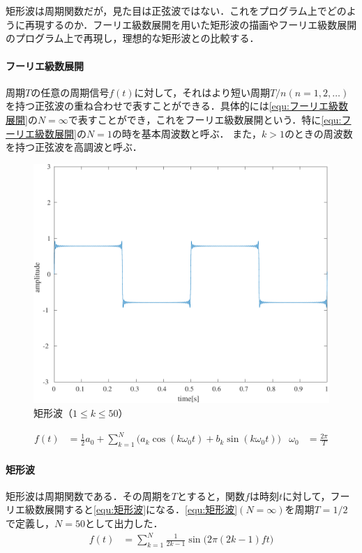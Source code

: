 \section{\kadaiad}\label{sec:\kadaiad}
\purpose
矩形波は周期関数だが，見た目は正弦波ではない．これをプログラム上でどのように再現するのか．フーリエ級数展開を用いた矩形波の描画やフーリエ級数展開のプログラム上で再現し，理想的な矩形波との比較する．
\method
\paragraph{フーリエ級数展開}周期\(T\)の任意の周期信号\(f(t)\)に対して，それはより短い周期\(T/n(n=1,2,\dots)\)を持つ正弦波の重ね合わせで表すことができる．具体的には\eqref{equ:フーリエ級数展開}の\(N=\infty\)で表すことができ，これをフーリエ級数展開という．\cite[p.18-p.19]{信号処理}特に\eqref{equ:フーリエ級数展開}の\(N=1\)の時を基本周波数と呼ぶ．
また，\(k>1\)のときの周波数を持つ正弦波を高調波と呼ぶ．

\begin{figure}
    \includegraphics[keepaspectratio,width=.3\textwidth]{../../Figures/01_04_1.pdf}
    \caption{矩形波（\(1\leq k\leq 50\)）}
    \label{fig:矩形波}
\end{figure}
\begin{align}
    f(t) & =\frac{1}{2}a_0 + \sum_{k=1}^{N}\big(a_k\cos(k\omega_0t)+b_k\sin(k\omega_0t)\big) & \omega_0 & =\frac{2\pi}{T}\label{equ:フーリエ級数展開}
\end{align}
\paragraph{矩形波}
矩形波は周期関数である．その周期を\(T\)とすると，関数\(f\)は時刻\(t\)に対して，フーリエ級数展開すると\eqref{equ:矩形波}になる．\eqref{equ:矩形波}\((N=\infty)\)を周期\(T=1/2\)で定義し，\(N=50\)として出力した．
\begin{align}
    f(t) & =\sum_{k=1}^{N}\frac{1}{2k-1}\sin\big(2\pi(2k-1)ft\big)\label{equ:矩形波}
\end{align}
